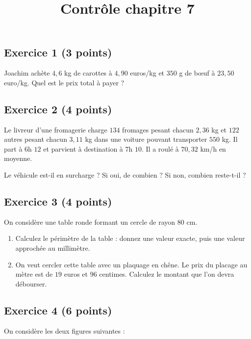 \documentclass[14pt]{extreport}
\title{Contrôle chapitre 7}
\date{}
\theoremstyle{plain}
\begin{document}
\subsection*{Exercice 1 (3 points)}

Joachim achète $4,6$ kg de carottes à $4,90$ euros/kg et $350$ g de bœuf à $23,50$ euro/kg. Quel est le prix total à payer ?

\subsection*{Exercice 2 (4 points)}

Le livreur d'une fromagerie charge $134$ fromages pesant chacun $2,36$ kg
et $122$ autres pesant chacun $3,11$ kg dans une voiture pouvant transporter $550$ kg. Il part à $6$h $12$ et parvient à destination à $7$h $10$. Il a roulé à $70,32$ km/h en moyenne. 

Le véhicule est-il en surcharge ?
Si oui, de combien ? Si non, combien reste-t-il ?

\subsection*{Exercice 3 (4 points)}  %

On considère une table ronde formant un cercle de rayon $80$ cm. 
\begin{enumerate}
\item Calculez le périmètre de la table : donnez une valeur exacte, puis une valeur approchée au millimètre.
\item On veut cercler cette table avec un plaquage en chêne. Le prix du placage au mètre est de $19$ euros et $96$ centimes. Calculez le montant que l'on devra débourser.
\end{enumerate}




\subsection*{Exercice 4 (6 points)}
On considère les deux figures suivantes : 
\end{document}
